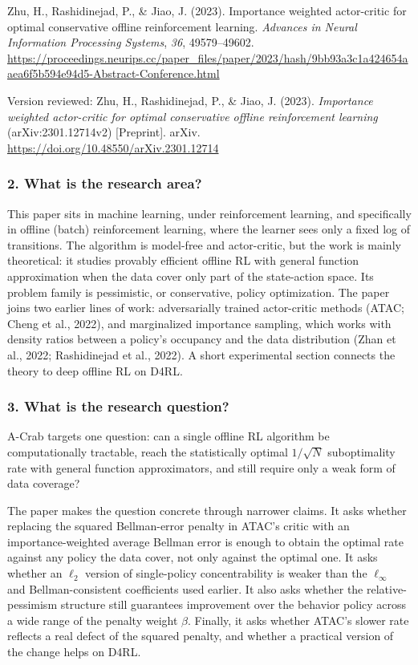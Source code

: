 \documentclass[11pt]{article}
\newenvironment{hangref}{\par\hangindent=0.5in\hangafter=1\noindent}{\par}
\newcommand{\question}[1]{\subsubsection*{#1}}
\begin{document}
\begin{hangref}Zhu, H., Rashidinejad, P., \& Jiao, J. (2023). Importance weighted actor-critic for optimal conservative offline reinforcement learning. \emph{Advances in Neural Information Processing Systems}, \emph{36}, 49579--49602. \url{https://proceedings.neurips.cc/paper_files/paper/2023/hash/9bb93a3c1a424654aaea6f5b594e94d5-Abstract-Conference.html}\end{hangref}
\begin{hangref}Version reviewed: Zhu, H., Rashidinejad, P., \& Jiao, J. (2023). \emph{Importance weighted actor-critic for optimal conservative offline reinforcement learning} (arXiv:2301.12714v2) [Preprint]. arXiv. \url{https://doi.org/10.48550/arXiv.2301.12714}\end{hangref}

\question{2. What is the research area?}

This paper sits in machine learning, under reinforcement learning, and specifically in offline (batch) reinforcement learning, where the learner sees only a fixed log of transitions. The algorithm is model-free and actor-critic, but the work is mainly theoretical: it studies provably efficient offline RL with general function approximation when the data cover only part of the state-action space. Its problem family is pessimistic, or conservative, policy optimization. The paper joins two earlier lines of work: adversarially trained actor-critic methods (ATAC; Cheng et al., 2022), and marginalized importance sampling, which works with density ratios between a policy's occupancy and the data distribution (Zhan et al., 2022; Rashidinejad et al., 2022). A short experimental section connects the theory to deep offline RL on D4RL.

\question{3. What is the research question?}

A-Crab targets one question: can a single offline RL algorithm be computationally tractable, reach the statistically optimal $1/\sqrt{N}$ suboptimality rate with general function approximators, and still require only a weak form of data coverage?

The paper makes the question concrete through narrower claims. It asks whether replacing the squared Bellman-error penalty in ATAC's critic with an importance-weighted average Bellman error is enough to obtain the optimal rate against any policy the data cover, not only against the optimal one. It asks whether an $\ell_2$ version of single-policy concentrability is weaker than the $\ell_\infty$ and Bellman-consistent coefficients used earlier. It also asks whether the relative-pessimism structure still guarantees improvement over the behavior policy across a wide range of the penalty weight \ensuremath{\beta}. Finally, it asks whether ATAC's slower rate reflects a real defect of the squared penalty, and whether a practical version of the change helps on D4RL.
\end{document}
